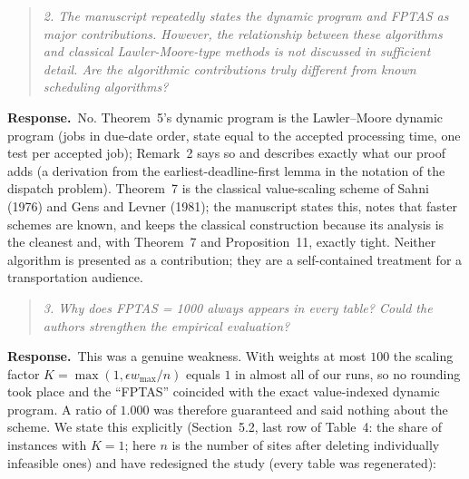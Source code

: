 \documentclass[11pt]{article}
\newenvironment{comment}{\par\medskip\begin{quote}\small\itshape}{\end{quote}}
\newcommand{\reply}{\noindent\textbf{Response.}\ }
\begin{document}
\begin{comment}
2. The manuscript repeatedly states the dynamic program and FPTAS as
major contributions. However, the relationship between these algorithms
and classical Lawler-Moore-type methods is not discussed in sufficient
detail. Are the algorithmic contributions truly different from known
scheduling algorithms?
\end{comment}

\reply No. Theorem~5's dynamic program is the Lawler--Moore dynamic
program (jobs in due-date order, state equal to the accepted processing
time, one test per accepted job); Remark~2 says so and describes exactly
what our proof adds (a derivation from the earliest-deadline-first lemma
in the notation of the dispatch problem). Theorem~7 is the classical
value-scaling scheme of Sahni (1976) and Gens and Levner (1981); the
manuscript states this, notes that faster schemes are known, and keeps
the classical construction because its analysis is the cleanest and,
with Theorem~7 and Proposition~11, exactly tight. Neither algorithm is
presented as a contribution; they are a self-contained treatment for a
transportation audience.

\begin{comment}
3. Why does FPTAS = 1000 always appears in every table? Could the
authors strengthen the empirical evaluation?
\end{comment}

\reply This was a genuine weakness. With weights at most $100$ the
scaling factor $K=\max(1,\epsilon w_{\max}/n)$ equals $1$ in almost all
of our runs, so no rounding took place and the ``FPTAS'' coincided with
the exact value-indexed dynamic program. A ratio of $1.000$ was therefore
guaranteed and said nothing about the scheme. We state this explicitly
(Section~5.2, last row of Table~4: the share of instances with $K=1$;
here $n$ is the number of sites after deleting individually infeasible
ones) and have redesigned the study (every table was regenerated):
\end{document}
